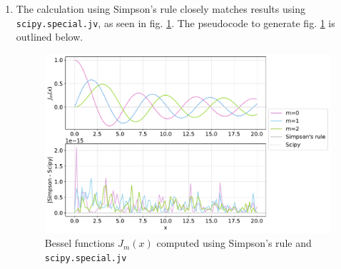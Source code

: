 \documentclass{article}
\newcommand{\code}{\texttt}
\begin{document}
\begin{enumerate}
\begin{enumerate}
    Plotting 
    \begin{lstlisting}[
        numbers=left,
        numberstyle=\small\itshape,
        stepnumber=1,
        frame=lines,
        escapeinside={(*}{*)},
        breaklines=true,
        breakautoindent=true, breakindent=-1pt ] 
Initialize and set the number of plotted points nvals=100
For each value of m:
    Initialize x_arr with nvals equally spaced points between 0 and 20
    Compute y_arr as J(m, x) for each x in x_arr
    Plot y_arr vs x_arr
    \end{lstlisting}

    \item The calculation using Simpson's rule closely matches results using \code{scipy.special.jv}, as seen in fig. \ref{fig:1b}. The pseudocode to generate fig. \ref{fig:1b} is outlined below.
    \begin{figure}[H]
        \centering
        \includegraphics[width=0.8\linewidth]{1b.pdf}
        \caption{\label{fig:1b} Bessel functions $J_m(x)$ computed using Simpson's rule and \code{scipy.special.jv}}
    \end{figure} 


\end{enumerate}
\end{enumerate}
\end{document}
